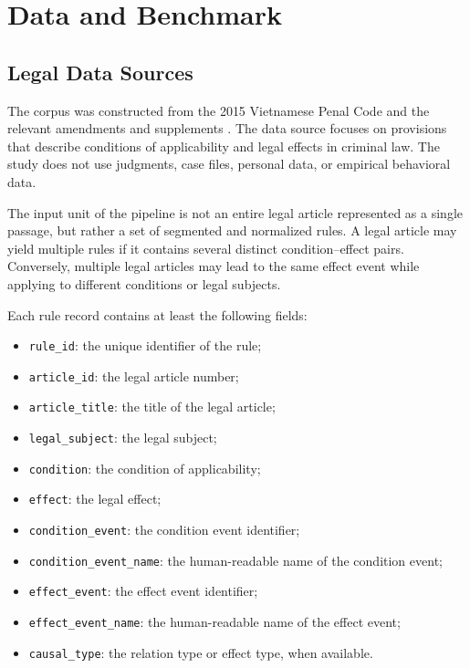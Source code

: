 \section{Data and Benchmark}
\label{sec:data}

\subsection{Legal Data Sources}

The corpus was constructed from the 2015 Vietnamese Penal Code and the
relevant amendments and supplements
\cite{quochoi2015blhs,quochoi2017suadoiblhs}. The data source focuses on
provisions that describe conditions of applicability and legal effects in
criminal law. The study does not use judgments, case files, personal data,
or empirical behavioral data.

The input unit of the pipeline is not an entire legal article represented as
a single passage, but rather a set of segmented and normalized rules. A legal
article may yield multiple rules if it contains several distinct
condition--effect pairs. Conversely, multiple legal articles may lead to the
same effect event while applying to different conditions or legal subjects.

Each rule record contains at least the following fields:

\begin{itemize}
    \item \texttt{rule\_id}: the unique identifier of the rule;
    \item \texttt{article\_id}: the legal article number;
    \item \texttt{article\_title}: the title of the legal article;
    \item \texttt{legal\_subject}: the legal subject;
    \item \texttt{condition}: the condition of applicability;
    \item \texttt{effect}: the legal effect;
    \item \texttt{condition\_event}: the condition event identifier;
    \item \texttt{condition\_event\_name}: the human-readable name of the
    condition event;
    \item \texttt{effect\_event}: the effect event identifier;
    \item \texttt{effect\_event\_name}: the human-readable name of the effect
    event;
    \item \texttt{causal\_type}: the relation type or effect type, when
    available.
\end{itemize}

